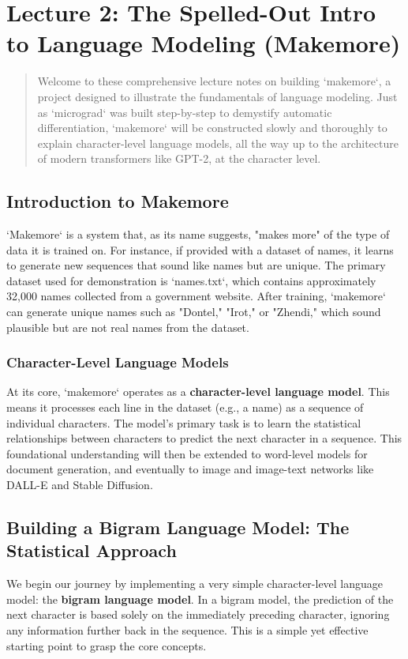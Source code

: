 
\section{Lecture 2: The Spelled-Out Intro to Language Modeling (Makemore)}

\begin{abstract}
Welcome to these comprehensive lecture notes on building `makemore`, a project designed to illustrate the fundamentals of language modeling. Just as `micrograd` was built step-by-step to demystify automatic differentiation, `makemore` will be constructed slowly and thoroughly to explain character-level language models, all the way up to the architecture of modern transformers like GPT-2, at the character level.
\end{abstract}

\subsection{Introduction to Makemore}
`Makemore` is a system that, as its name suggests, "makes more" of the type of data it is trained on. For instance, if provided with a dataset of names, it learns to generate new sequences that sound like names but are unique. The primary dataset used for demonstration is `names.txt`, which contains approximately 32,000 names collected from a government website. After training, `makemore` can generate unique names such as "Dontel," "Irot," or "Zhendi," which sound plausible but are not real names from the dataset.

\subsubsection{Character-Level Language Models}
At its core, `makemore` operates as a \textbf{character-level language model}. This means it processes each line in the dataset (e.g., a name) as a sequence of individual characters. The model's primary task is to learn the statistical relationships between characters to predict the next character in a sequence. This foundational understanding will then be extended to word-level models for document generation, and eventually to image and image-text networks like DALL-E and Stable Diffusion.

\subsection{Building a Bigram Language Model: The Statistical Approach}
We begin our journey by implementing a very simple character-level language model: the \textbf{bigram language model}. In a bigram model, the prediction of the next character is based solely on the immediately preceding character, ignoring any information further back in the sequence. This is a simple yet effective starting point to grasp the core concepts.

